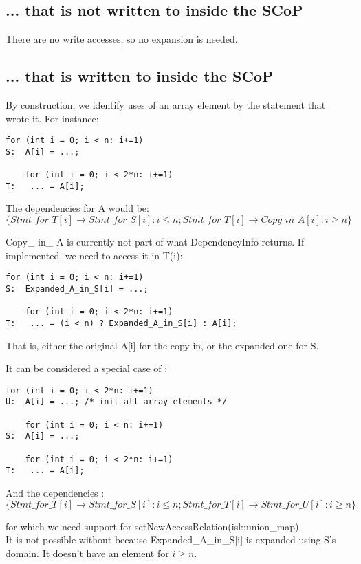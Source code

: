 \subsection{... that is not written to inside the SCoP}
There are no write accesses, so no expansion is needed.

\subsection{... that is written to inside the SCoP}
By construction, we identify uses of an array element by the statement that wrote it. For instance:
\begin{lstlisting}[frame=single]
    for (int i = 0; i < n: i+=1)
S:  A[i] = ...;

    for (int i = 0; i < 2*n: i+=1)
T:   ... = A[i];
\end{lstlisting}

The dependencies for A would be:
\[
\{ Stmt\_for\_T[i] \rightarrow Stmt\_for\_S[i] : i \le n; Stmt\_for\_T[i] \rightarrow Copy\_in\_A[i] : i \ge n \}
\]

Copy\_ in\_ A is currently not part of what DependencyInfo returns. If implemented, we need to access it in T(i):
\begin{lstlisting}[frame=single]
    for (int i = 0; i < n: i+=1)
S:  Expanded_A_in_S[i] = ...;

    for (int i = 0; i < 2*n: i+=1)
T:   ... = (i < n) ? Expanded_A_in_S[i] : A[i];
\end{lstlisting}

That is, either the original A[i] for the copy-in, or the expanded one for S.

It can be considered a special case of :
\begin{lstlisting}[frame=single]
    for (int i = 0; i < 2*n: i+=1)
U:  A[i] = ...; /* init all array elements */

    for (int i = 0; i < n: i+=1)
S:  A[i] = ...;

    for (int i = 0; i < 2*n: i+=1)
T:   ... = A[i];
\end{lstlisting}

And the dependencies :
\[
\{ Stmt\_for\_T[i] \rightarrow Stmt\_for\_S[i] : i \le n; Stmt\_for\_T[i] \rightarrow Stmt\_for\_U[i] : i \ge n \}
\]

for which we need support for setNewAccessRelation(isl::union\_map). \\

It is not possible without because Expanded\_A\_in\_S[i] is expanded using S's domain. It doesn't have an element for $i \ge n$.

